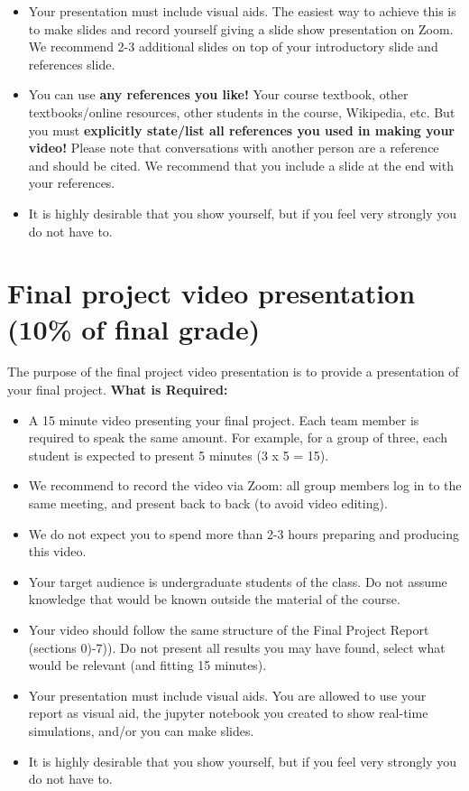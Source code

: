\documentclass[11pt]{article}
\begin{document}
\begin{itemize}
\begin{enumerate}
\end{enumerate}
\item Your presentation must include visual aids. The easiest way to achieve this is to make slides and record yourself giving a slide show presentation on Zoom. We recommend 2-3 additional slides on top of your introductory slide and references slide. 
\item You can use \textbf{any references you like!} Your course textbook, other textbooks/online resources, other students in the course, Wikipedia, etc. But you must \textbf{explicitly state/list all references you used in making your video!} Please note that conversations with another person are a reference and should be cited. We recommend that you include a slide at the end with your references.
\item It is highly desirable that you show yourself, but if you feel very strongly you do not have to.
\end{itemize}

\section{Final project video presentation (10\% of final grade)}

The purpose of the final project video presentation is to provide a presentation of your final project.
 \textbf{What is Required:}
\begin{itemize}
\item A 15 minute video presenting your final project. Each team member is required to speak the same amount. For example, for a group of three, each student is expected to present 5 minutes (3 x 5 = 15).
\item We recommend to record the video via Zoom: all group members log in to the same meeting, and present back to back (to avoid video editing).
\item We do not expect you to spend more than 2-3 hours preparing and producing this video. 
\item Your target audience is undergraduate students of the class. Do not assume knowledge that would be known outside the material of the course.
\item Your video should follow the same structure of the Final Project Report (sections 0)-7)). Do not present all results you may have found, select what would be relevant (and fitting 15 minutes).
\item Your presentation must include visual aids. You are allowed to use your report as visual aid, the jupyter notebook you created to show real-time simulations, and/or you can make slides.
\item It is highly desirable that you show yourself, but if you feel very strongly you do not have to.
\end{itemize}
\end{document}
